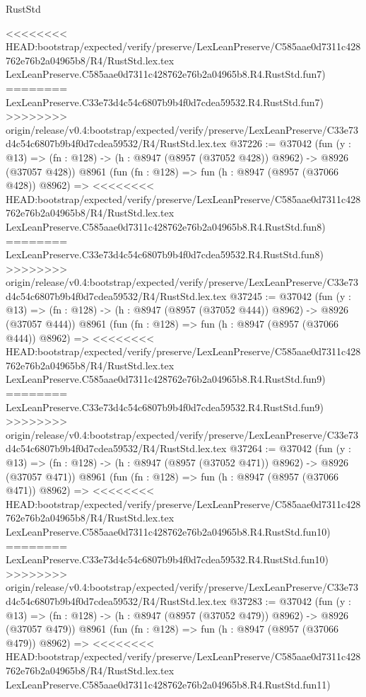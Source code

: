 \begin{lexlean}{RustStd}
\begin{coremodule}
{\begin{coremodule}
{{{{{{{{{{{{{{{{{{{{{{{{{{{{{{{{{{{{{{{<<<<<<<< HEAD:bootstrap/expected/verify/preserve/LexLeanPreserve/C585aae0d7311c428762e76b2a04965b8/R4/RustStd.lex.tex
    LexLeanPreserve.C585aae0d7311c428762e76b2a04965b8.R4.RustStd.fun7)
========
    LexLeanPreserve.C33e73d4c54c6807b9b4f0d7cdea59532.R4.RustStd.fun7)
>>>>>>>> origin/release/v0.4:bootstrap/expected/verify/preserve/LexLeanPreserve/C33e73d4c54c6807b9b4f0d7cdea59532/R4/RustStd.lex.tex
@37226 := @37042
    (fun (y : @13) => (fn : @128) -> (h : @8947 (@8957 (@37052 @428)) @8962) -> @8926 (@37057 @428))
    @8961
    (fun (fn : @128) =>
    fun (h : @8947 (@8957 (@37066 @428)) @8962) =>
<<<<<<<< HEAD:bootstrap/expected/verify/preserve/LexLeanPreserve/C585aae0d7311c428762e76b2a04965b8/R4/RustStd.lex.tex
    LexLeanPreserve.C585aae0d7311c428762e76b2a04965b8.R4.RustStd.fun8)
========
    LexLeanPreserve.C33e73d4c54c6807b9b4f0d7cdea59532.R4.RustStd.fun8)
>>>>>>>> origin/release/v0.4:bootstrap/expected/verify/preserve/LexLeanPreserve/C33e73d4c54c6807b9b4f0d7cdea59532/R4/RustStd.lex.tex
@37245 := @37042
    (fun (y : @13) => (fn : @128) -> (h : @8947 (@8957 (@37052 @444)) @8962) -> @8926 (@37057 @444))
    @8961
    (fun (fn : @128) =>
    fun (h : @8947 (@8957 (@37066 @444)) @8962) =>
<<<<<<<< HEAD:bootstrap/expected/verify/preserve/LexLeanPreserve/C585aae0d7311c428762e76b2a04965b8/R4/RustStd.lex.tex
    LexLeanPreserve.C585aae0d7311c428762e76b2a04965b8.R4.RustStd.fun9)
========
    LexLeanPreserve.C33e73d4c54c6807b9b4f0d7cdea59532.R4.RustStd.fun9)
>>>>>>>> origin/release/v0.4:bootstrap/expected/verify/preserve/LexLeanPreserve/C33e73d4c54c6807b9b4f0d7cdea59532/R4/RustStd.lex.tex
@37264 := @37042
    (fun (y : @13) => (fn : @128) -> (h : @8947 (@8957 (@37052 @471)) @8962) -> @8926 (@37057 @471))
    @8961
    (fun (fn : @128) =>
    fun (h : @8947 (@8957 (@37066 @471)) @8962) =>
<<<<<<<< HEAD:bootstrap/expected/verify/preserve/LexLeanPreserve/C585aae0d7311c428762e76b2a04965b8/R4/RustStd.lex.tex
    LexLeanPreserve.C585aae0d7311c428762e76b2a04965b8.R4.RustStd.fun10)
========
    LexLeanPreserve.C33e73d4c54c6807b9b4f0d7cdea59532.R4.RustStd.fun10)
>>>>>>>> origin/release/v0.4:bootstrap/expected/verify/preserve/LexLeanPreserve/C33e73d4c54c6807b9b4f0d7cdea59532/R4/RustStd.lex.tex
@37283 := @37042
    (fun (y : @13) => (fn : @128) -> (h : @8947 (@8957 (@37052 @479)) @8962) -> @8926 (@37057 @479))
    @8961
    (fun (fn : @128) =>
    fun (h : @8947 (@8957 (@37066 @479)) @8962) =>
<<<<<<<< HEAD:bootstrap/expected/verify/preserve/LexLeanPreserve/C585aae0d7311c428762e76b2a04965b8/R4/RustStd.lex.tex
    LexLeanPreserve.C585aae0d7311c428762e76b2a04965b8.R4.RustStd.fun11)
}}}}}}}}}}}}}}}}}}}}}}}}}}}}}}}}}}}}}}}
\end{coremodule}}
\end{coremodule}
\end{lexlean}
